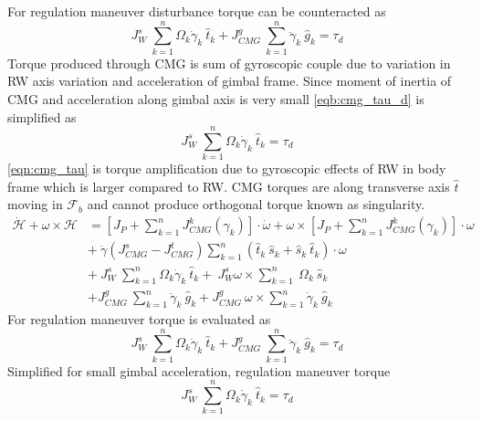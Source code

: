 For regulation maneuver disturbance torque can be counteracted as
\begin{equation}
J^{s}_{W} \ \sum ^{n}_{k=1} \Omega _{k}\dot{\gamma }_{k} \ \hat{t}_{k} +J^{g}_{CMG} \ \sum ^{n}_{k=1}\ddot{\gamma }_{k} \ \hat{g}_{k} =\tau _{d}
\label{eqb:cmg_tau_d}
\end{equation}
Torque produced through CMG is sum of gyroscopic couple due to variation in RW axis variation and acceleration of gimbal frame. Since moment of inertia of CMG and acceleration along gimbal axis is very small \autoref{eqb:cmg_tau_d} is simplified as
\begin{equation}
J^{s}_{W} \ \sum ^{n}_{k=1} \Omega _{k}\dot{\gamma }_{k} \ \hat{t}_{k} =\tau _{d}
\label{eqn:cmg_tau}
\end{equation}
\autoref{eqn:cmg_tau} is torque amplification due to gyroscopic effects of RW in body frame which is larger compared to RW. CMG torques are along transverse axis $\displaystyle \hat{t}$ moving in $\displaystyle \mathcal{F}_{b}$ and cannot produce orthogonal torque known as singularity.
\begin{equation}
\begin{aligned}
\dot{\mathcal{H}} +\omega \times \mathcal{H} & =\left[ J_{P} +\sum ^{n}_{k=1} J^{k}_{CMG}( \gamma _{k})\right] \cdotp \dot{\omega } +\omega \times \left[ J_{P} +\sum ^{n}_{k=1} J^{k}_{CMG}( \gamma _{k})\right] \cdotp \omega \\
 & +\ \dot{\gamma }\left( J^{s}_{CMG} -J^{t}_{CMG}\right)\sum ^{n}_{k=1}(\hat{t}_{k} \ \hat{s}_{k} +\hat{s}_{k} \ \hat{t}_{k}) \cdotp \omega \\
 & +\ J^{s}_{W} \ \sum ^{n}_{k=1} \Omega _{k}\dot{\gamma }_{k} \ \hat{t}_{k} +\ J^{s}_{W} \omega \times \sum ^{n}_{k=1} \ \Omega _{k} \ \hat{s}_{k}\\
 & +J^{g}_{CMG} \ \sum ^{n}_{k=1}\ddot{\gamma }_{k} \ \hat{g}_{k} +J^{g}_{CMG} \ \omega \times \sum ^{n}_{k=1}\dot{\gamma }_{k} \ \hat{g}_{k}
\end{aligned}
\end{equation}
For regulation maneuver torque is evaluated as
\begin{equation}
J^{s}_{W} \ \sum ^{n}_{k=1} \Omega _{k}\dot{\gamma }_{k} \ \hat{t}_{k} +J^{g}_{CMG} \ \sum ^{n}_{k=1}\ddot{\gamma }_{k} \ \hat{g}_{k} =\tau _{d}
\end{equation}
Simplified for small gimbal acceleration, regulation maneuver torque
\begin{equation}
J^{s}_{W} \ \sum ^{n}_{k=1} \Omega _{k}\dot{\gamma }_{k} \ \hat{t}_{k} =\tau _{d}
\end{equation}
